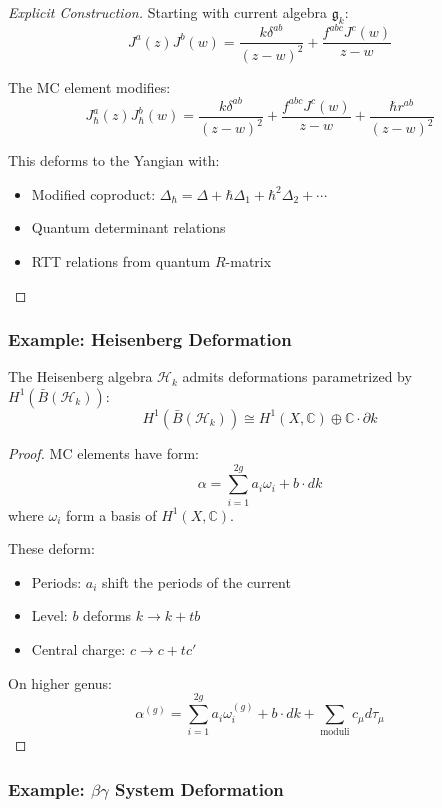 \begin{proof}[Explicit Construction]
Starting with current algebra $\mathfrak{g}_k$:
$$J^a(z)J^b(w) = \frac{k\delta^{ab}}{(z-w)^2} + \frac{f^{abc}J^c(w)}{z-w}$$

The MC element modifies:
$$J^a_\hbar(z)J^b_\hbar(w) = \frac{k\delta^{ab}}{(z-w)^2} + \frac{f^{abc}J^c(w)}{z-w} + \frac{\hbar r^{ab}}{(z-w)^2}$$

This deforms to the Yangian with:
\begin{itemize}
\item Modified coproduct: $\Delta_\hbar = \Delta + \hbar \Delta_1 + \hbar^2 \Delta_2 + \cdots$
\item Quantum determinant relations
\item RTT relations from quantum $R$-matrix
\end{itemize}
\end{proof}

\subsubsection{Example: Heisenberg Deformation}

\begin{theorem}
The Heisenberg algebra $\mathcal{H}_k$ admits deformations parametrized by $H^1(\bar{B}(\mathcal{H}_k))$:
$$H^1(\bar{B}(\mathcal{H}_k)) \cong H^1(X, \mathbb{C}) \oplus \mathbb{C} \cdot \partial k$$
\end{theorem}

\begin{proof}
MC elements have form:
$$\alpha = \sum_{i=1}^{2g} a_i \omega_i + b \cdot dk$$
where $\omega_i$ form a basis of $H^1(X, \mathbb{C})$.

These deform:
\begin{itemize}
\item Periods: $a_i$ shift the periods of the current
\item Level: $b$ deforms $k \to k + tb$
\item Central charge: $c \to c + tc'$
\end{itemize}

On higher genus:
$$\alpha^{(g)} = \sum_{i=1}^{2g} a_i \omega_i^{(g)} + b \cdot dk + \sum_{\text{moduli}} c_\mu d\tau_\mu$$
\end{proof}

\subsubsection{Example: $\beta\gamma$ System Deformation}

